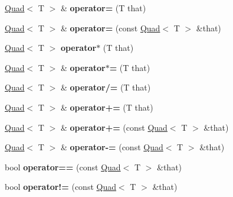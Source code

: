 \begin{DoxyCompactItemize}
\item 
\hypertarget{classfirestep_1_1_quad_abfbc5902b39995e7ccc1d3a0de311165}{\hyperlink{classfirestep_1_1_quad}{Quad}$<$ T $>$ \& {\bfseries operator=} (T that)}\label{classfirestep_1_1_quad_abfbc5902b39995e7ccc1d3a0de311165}

\item 
\hypertarget{classfirestep_1_1_quad_aa49ba6313524d4e47f7e80651f656eed}{\hyperlink{classfirestep_1_1_quad}{Quad}$<$ T $>$ \& {\bfseries operator=} (const \hyperlink{classfirestep_1_1_quad}{Quad}$<$ T $>$ \&that)}\label{classfirestep_1_1_quad_aa49ba6313524d4e47f7e80651f656eed}

\item 
\hypertarget{classfirestep_1_1_quad_acf4f7e0630ed4ead88b2f3dc784ee80e}{\hyperlink{classfirestep_1_1_quad}{Quad}$<$ T $>$ {\bfseries operator$\ast$} (T that)}\label{classfirestep_1_1_quad_acf4f7e0630ed4ead88b2f3dc784ee80e}

\item 
\hypertarget{classfirestep_1_1_quad_a7b39552fc122dbe845e0a77dcf96aacb}{\hyperlink{classfirestep_1_1_quad}{Quad}$<$ T $>$ \& {\bfseries operator$\ast$=} (T that)}\label{classfirestep_1_1_quad_a7b39552fc122dbe845e0a77dcf96aacb}

\item 
\hypertarget{classfirestep_1_1_quad_ae619e27bba0f1981569a56025572c803}{\hyperlink{classfirestep_1_1_quad}{Quad}$<$ T $>$ \& {\bfseries operator/=} (T that)}\label{classfirestep_1_1_quad_ae619e27bba0f1981569a56025572c803}

\item 
\hypertarget{classfirestep_1_1_quad_abe6b69b5707b71899dfad30f0e77cf0b}{\hyperlink{classfirestep_1_1_quad}{Quad}$<$ T $>$ \& {\bfseries operator+=} (T that)}\label{classfirestep_1_1_quad_abe6b69b5707b71899dfad30f0e77cf0b}

\item 
\hypertarget{classfirestep_1_1_quad_a0057f45c1634052af5b9d6f98111ee69}{\hyperlink{classfirestep_1_1_quad}{Quad}$<$ T $>$ \& {\bfseries operator+=} (const \hyperlink{classfirestep_1_1_quad}{Quad}$<$ T $>$ \&that)}\label{classfirestep_1_1_quad_a0057f45c1634052af5b9d6f98111ee69}

\item 
\hypertarget{classfirestep_1_1_quad_a75aa9c24ad6035ef5ce4d82dfd47b87d}{\hyperlink{classfirestep_1_1_quad}{Quad}$<$ T $>$ \& {\bfseries operator-\/=} (const \hyperlink{classfirestep_1_1_quad}{Quad}$<$ T $>$ \&that)}\label{classfirestep_1_1_quad_a75aa9c24ad6035ef5ce4d82dfd47b87d}

\item 
\hypertarget{classfirestep_1_1_quad_a3858528b1bb15d14fee7e3eaa26e8762}{bool {\bfseries operator==} (const \hyperlink{classfirestep_1_1_quad}{Quad}$<$ T $>$ \&that)}\label{classfirestep_1_1_quad_a3858528b1bb15d14fee7e3eaa26e8762}

\item 
\hypertarget{classfirestep_1_1_quad_aca957edd4f329bd0a7278558646620ab}{bool {\bfseries operator!=} (const \hyperlink{classfirestep_1_1_quad}{Quad}$<$ T $>$ \&that)}\label{classfirestep_1_1_quad_aca957edd4f329bd0a7278558646620ab}

\end{DoxyCompactItemize}

